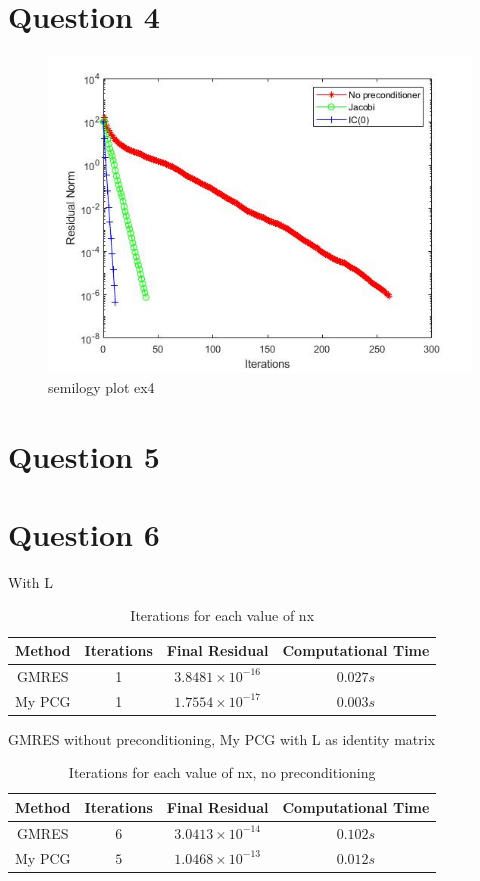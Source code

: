 \documentclass[a4paper, 11pt]{article}
\begin{document}
		
		
		
		\section*{Question 4}		
		\begin{figure}[H]
			\centering
			\includegraphics[width=.6\linewidth]{ex4.jpg}
			\caption{semilogy plot ex4}
			\label{fig:ex4}
		\end{figure}
		
		
		\section*{Question 5}
		
		
		\section*{Question 6}
		
			
		
		With L
		
		\begin{table}[H]
			\centering
			\begin{tabular}{c|c|c|c}
				\textbf{Method} &  \textbf{Iterations} 	& \textbf{Final Residual} 		& \textbf{Computational Time} 	\\ \hline
				GMRES 			& 			1 			& $ 3.8481 \times 10^{-16} $	& $ 0.027 s $	\\ \hline	
				My PCG 			& 			1			& $ 1.7554 \times 10^{-17} $	& $ 0.003 s $	\\ \hline
			\end{tabular}
			\caption{Iterations for each value of nx}
			\label{table:ex4_c_prec}
		\end{table}	
	
		GMRES without preconditioning, My PCG with L as identity matrix
			
		\begin{table}[H]
			\centering
			\begin{tabular}{c|c|c|c}
				\textbf{Method} &  \textbf{Iterations} 	& \textbf{Final Residual} 		& \textbf{Computational Time} 	\\ \hline
				GMRES			& 			$6$ 		& $ 3.0413 \times 10^{-14} $ 	& $ 0.102 s $	\\ \hline	
				My PCG 			& 			$5$			& $ 1.0468 \times 10^{-13} $	& $ 0.012 s $	\\ \hline
			\end{tabular}
			\caption{Iterations for each value of nx, no preconditioning}
			\label{table:ex4_c_NoPrec}
		\end{table}
	
\end{document}
